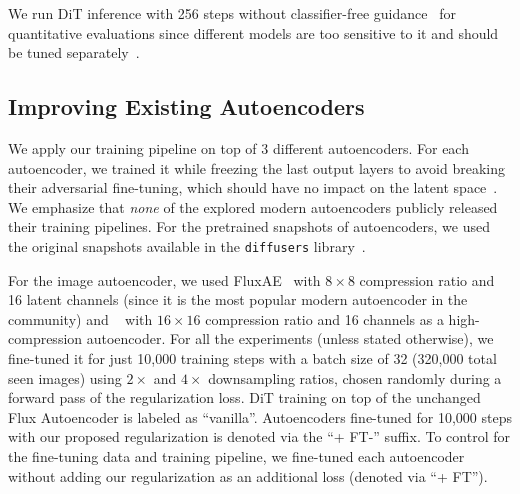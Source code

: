 We run DiT inference with 256 steps without classifier-free guidance~\cite{CFG} for quantitative evaluations since different models are too sensitive to it and should be tuned separately~\cite{EDMv2, CFG_in_interval}.


\subsection{Improving Existing Autoencoders}
\label{sec:experiments:main}
We apply our training pipeline on top of 3 different autoencoders.
For each autoencoder, we trained it while freezing the last output layers to avoid breaking their adversarial fine-tuning, which should have no impact on the latent space~\cite{DC-AE}.
We emphasize that \emph{none} of the explored modern autoencoders publicly released their training pipelines.
For the pretrained snapshots of autoencoders, we used the original snapshots available in the \verb|diffusers| library~\cite{diffusers}.

For the image autoencoder, we used FluxAE~\cite{Flux} with $8 \times 8$ compression ratio and 16 latent channels (since it is the most popular modern autoencoder in the community) and \cmsaei~\cite{CosmosTokenizer} with $16 \times 16$ compression ratio and 16 channels as a high-compression autoencoder.
For all the experiments (unless stated otherwise), we fine-tuned it for just 10,000 training steps with a batch size of 32 (320,000 total seen images) using $2\times$ and $4\times$ downsampling ratios, chosen randomly during a forward pass of the regularization loss.
DiT training on top of the unchanged Flux Autoencoder is labeled as ``vanilla''.
Autoencoders fine-tuned for 10,000 steps with our proposed \regshortname regularization is denoted via the ``+ FT-\regshortname'' suffix.
To control for the fine-tuning data and training pipeline, we fine-tuned each autoencoder without adding our regularization as an additional loss (denoted via ``+ FT'').


